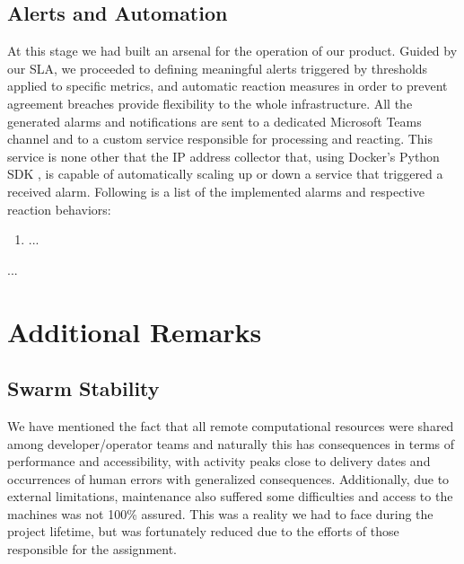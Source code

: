 \documentclass[12pt]{article}
\begin{document}
\subsection{Alerts and Automation} \label{management.automation} %


At this stage we had built an arsenal for the operation of our product.
Guided by our SLA, we proceeded to defining meaningful alerts triggered by thresholds applied to specific metrics, and automatic reaction measures in order to 
prevent agreement breaches provide flexibility to the whole infrastructure.
All the generated alarms and notifications are sent to a dedicated Microsoft Teams channel and to a custom service responsible for processing and reacting. 
This service is none other that the IP address collector that, using Docker's Python SDK \cite{dockerpythonsdk}, is capable of automatically scaling up or down 
a service that triggered a received alarm.
Following is a list of the implemented alarms and respective reaction behaviors:

\vspace{-10pt}
\begin{enumerate}[noitemsep]
  \item ...
\end{enumerate}
\vspace{-10pt}

...

\newpage
\section{Additional Remarks} \label{remarks} %

\subsection{Swarm Stability} \label{remarks.stability} %

We have mentioned the fact that all remote computational resources were shared among developer/operator teams and naturally this has consequences in terms of 
performance and accessibility, with activity peaks close to delivery dates and occurrences of human errors with generalized consequences.
Additionally, due to external limitations, maintenance also suffered some difficulties and access to the machines was not 100\% assured.
This was a reality we had to face during the project lifetime, but was fortunately reduced due to the efforts of those responsible for the assignment.
\end{document}

